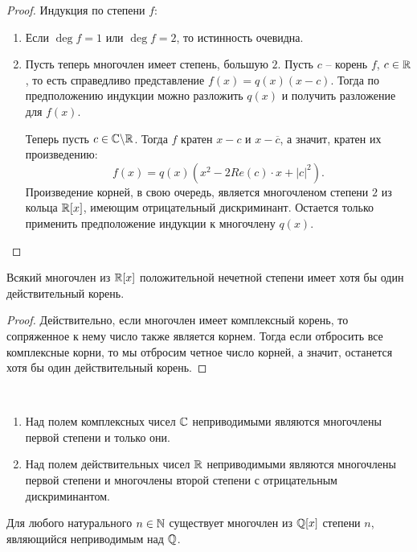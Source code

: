\begin{proof}
    Индукция по степени $f$:
    \begin{enumerate}
        \item Если $\deg f = 1$ или $\deg f = 2$, то истинность очевидна.
        \item Пусть теперь многочлен имеет степень, большую $2$. Пусть $c$ -- корень $f$, $c \in \mathbb{R}$, то есть
        справедливо представление $f(x) = q(x)(x-c)$. Тогда по предположению индукции можно разложить 
        $q(x)$ и получить разложение для $f(x)$. 

        Теперь пусть $c \in \mathbb{C} \backslash \mathbb{R}$. Тогда $f$ кратен $x - c$ и $x - \overline{c}$, 
        а значит, кратен их произведению: $$f(x) = q(x)(x^2 - 2 Re(c) \cdot x + |c|^2).$$
        Произведение корней, в свою очередь, является многочленом степени $2$ из кольца $\mathbb{R}[x]$, 
        имеющим отрицательный дискриминант. Остается только применить предположение индукции к 
        многочлену $q(x)$.
    \end{enumerate}
\end{proof}

\begin{corollary}
    Всякий многочлен из $\mathbb{R}[x]$ положительной нечетной степени имеет хотя бы один действительный корень.
\end{corollary}

\begin{proof}
    Действительно, если многочлен имеет комплексный корень, то сопряженное к нему число также является корнем.
    Тогда если отбросить все комплексные корни, то мы отбросим четное число корней, а значит, останется 
    хотя бы один действительный корень.
\end{proof}

\begin{corollary}~
    \begin{enumerate}
        \item Над полем комплексных чисел $\mathbb{C}$ неприводимыми являются многочлены первой степени и только они.
        \item Над полем действительных чисел $\mathbb{R}$ неприводимыми являются многочлены первой степени и многочлены второй степени с отрицательным дискриминантом.
    \end{enumerate}
\end{corollary}

\begin{proposition}
    Для любого натурального $n \in \mathbb{N}$ существует многочлен из $\mathbb{Q}[x]$ степени $n$, являющийся неприводимым над $\mathbb{Q}$.
\end{proposition}

